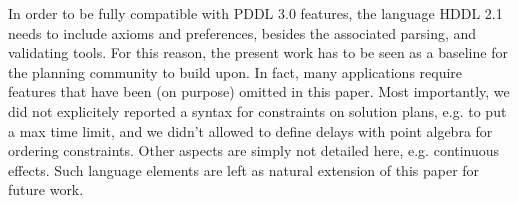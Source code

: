 \documentclass[letterpaper]{article} %
\begin{document}
In order to be fully compatible with PDDL 3.0 features, the language HDDL 2.1 needs to include axioms and preferences, besides the associated parsing, and validating tools. For this reason, the present work has to be seen as a baseline for the planning community to build upon.
In fact, many applications require features that have been (on purpose) omitted in this paper. Most importantly, we did not explicitely reported a syntax for constraints on solution plans, e.g. to put a max time limit, and we didn't allowed to define delays  with point algebra for ordering constraints. Other aspects are simply not detailed here, e.g. continuous effects.
Such language elements are left as natural extension of this paper for future work.



\appendix

\end{document}
